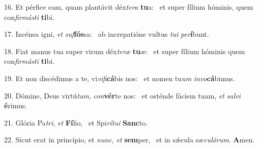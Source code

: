 16. Et pérfice eam, quam plantávit déx\textit{te}\textit{ra} \textbf{tu}a: \ast\  et super fílium hóminis, quem con\textit{fir}\textit{más}\textit{ti} \textbf{ti}bi.\

17. Incénsa igni, \textit{et} \textit{suf}\textbf{fós}sa: \ast\  ab increpatióne vultus \textit{tu}\textit{i} \textit{per}\textbf{í}bunt.\

18. Fiat manus tua super virum déx\textit{te}\textit{ræ} \textbf{tu}æ: \ast\  et super fílium hóminis quem con\textit{fir}\textit{más}\textit{ti} \textbf{ti}bi.\

19. Et non discédimus a te, vi\textit{vi}\textit{fi}\textbf{cá}bis nos: \ast\  et nomen tu\textit{um} \textit{in}\textit{vo}\textbf{cá}bimus.\

20. Dómine, Deus virtú\textit{tum}, \textit{con}\textbf{vér}te nos: \ast\  et osténde fáciem tuam, \textit{et} \textit{sal}\textit{vi} \textbf{é}rimus.\

21. Glória Pa\textit{tri}, \textit{et} \textbf{Fí}lio, \ast\  et Spi\textit{rí}\textit{tu}\textit{i} \textbf{Sanc}to.\

22. Sicut erat in princípio, et \textit{nunc}, \textit{et} \textbf{sem}per, \ast\  et in sǽcula sæ\textit{cu}\textit{ló}\textit{rum}. \textbf{A}men.\

